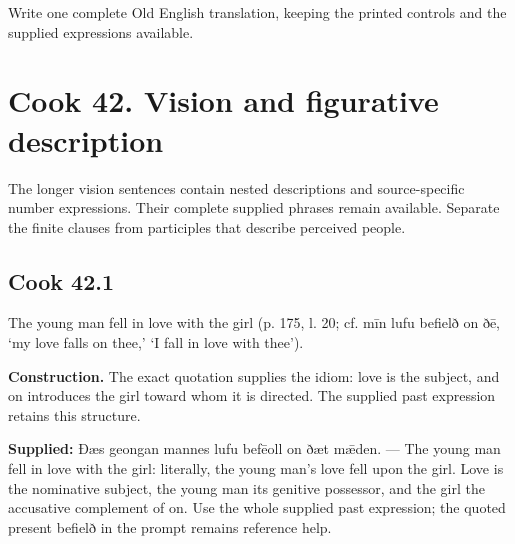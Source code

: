 Write one complete Old English translation, keeping the printed controls and the supplied expressions available.

\section*{Cook 42. Vision and figurative description}

The longer vision sentences contain nested descriptions and source-specific number expressions. Their complete supplied phrases remain available. Separate the finite clauses from participles that describe perceived people.

\par\begin{minipage}{\linewidth}\raggedright
\subsection*{Cook 42.1}

The young man fell in love with the girl (p. 175, l. 20; cf. mīn lufu befielð on ðē, ‘my love falls on thee,’ ‘I fall in love with thee’).

\end{minipage}\par\addvspace{4pt}

\textbf{Construction.} The exact quotation supplies the idiom: love is the subject, and on introduces the girl toward whom it is directed. The supplied past expression retains this structure.

\textbf{Supplied:} Ðæs geongan mannes lufu befēoll on ðæt mǣden. — The young man fell in love with the girl: literally, the young man’s love fell upon the girl. Love is the nominative subject, the young man its genitive possessor, and the girl the accusative complement of on. Use the whole supplied past expression; the quoted present befielð in the prompt remains reference help.

